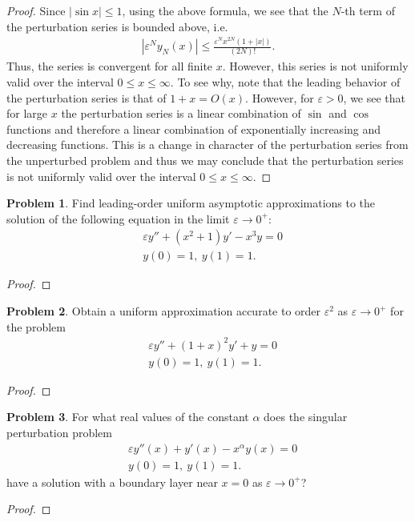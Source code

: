 \documentclass[12pt]{article}
\theoremstyle{definition}
\newtheorem{problem}{Problem}
\begin{document}
\begin{proof}
  Since $\left|\sin x\right| \leq 1$, using the above formula, we see that the   $N$-th term of the perturbation series is bounded above, i.e.\
  \begin{align*}
    \left|\varepsilon^N y_N(x)\right| \leq \frac{\varepsilon^N x^{2N} (1 + |x|)}{(2N)!}.
  \end{align*}
  Thus, the series is convergent for all finite $x$. However, this series is not uniformly valid over the interval
  $0 \leq x \leq \infty$. To see why, note that the leading behavior of the perturbation series
  is that of $1 + x = O(x)$. However, for $\varepsilon > 0$, we see that for large $x$  the perturbation series
  is a linear combination of $\sin $ and $\cos$ functions and therefore a linear combination of exponentially increasing and decreasing functions.
  This is a change in character of the perturbation series from the unperturbed problem and thus we may
  conclude that the perturbation series is not uniformly valid over the interval $0 \leq x \leq \infty$.
\end{proof}
\newpage


\begin{problem}
  Find leading-order uniform asymptotic approximations to the solution of the
  following equation in the limit $\varepsilon \to 0^+$:
  \begin{align*}
    &\varepsilon y'' + (x^2 + 1)y' - x^3y=0 \\
    &y(0) = 1,\ y(1) = 1.
  \end{align*}
\end{problem}

\begin{proof}
\end{proof}
\newpage


\begin{problem}
  Obtain a uniform approximation accurate to order $\varepsilon ^2$ as $\varepsilon \to 0^+$
  for the problem
  \begin{align*}
      &\varepsilon y'' + (1+x)^2 y' + y = 0 \\
      &y(0) = 1,\ y(1) = 1.
  \end{align*}
\end{problem}

\begin{proof}
\end{proof}
\newpage


\begin{problem}
  For what real values of the constant $\alpha$ does the singular perturbation
  problem
  \begin{align*}
    &\varepsilon y''(x) + y'(x) - x^\alpha y(x) = 0  \\
    &y(0) = 1,\ y(1) = 1.
  \end{align*}
  have a solution with a boundary layer near $x=0$ as $\varepsilon \to 0^+$?
\end{problem}

\begin{proof}
\end{proof}
\newpage
\end{document}
